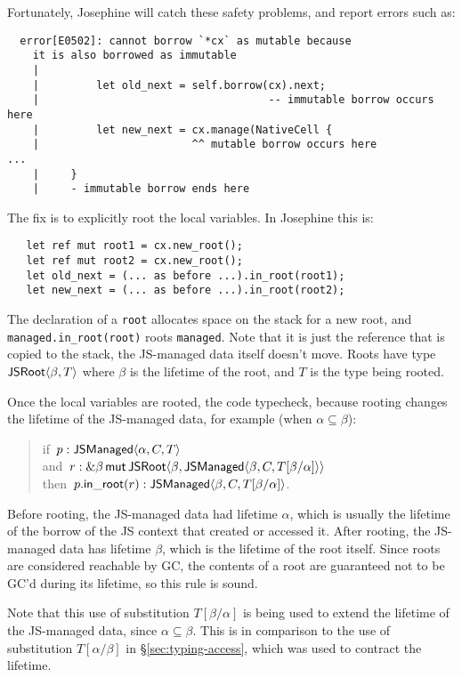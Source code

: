 Fortunately, Josephine will catch these safety problems, and report
errors such as:
\begin{verbatim}
  error[E0502]: cannot borrow `*cx` as mutable because
    it is also borrowed as immutable
    |
    |         let old_next = self.borrow(cx).next;
    |                                    -- immutable borrow occurs here
    |         let new_next = cx.manage(NativeCell {
    |                        ^^ mutable borrow occurs here
...
    |     }
    |     - immutable borrow ends here
\end{verbatim}
The fix is to explicitly root the local variables. In Josephine this is:
\begin{verbatim}
   let ref mut root1 = cx.new_root();
   let ref mut root2 = cx.new_root();
   let old_next = (... as before ...).in_root(root1);
   let new_next = (... as before ...).in_root(root2);
\end{verbatim}
The declaration of a \verb|root| allocates space on the stack
for a new root, and \verb|managed.in_root(root)| roots \verb|managed|.
Note that it is just the reference that is copied to the stack,
the JS-managed data itself doesn't move.
Roots have type $\mathsf{JSRoot}\langle \beta,T\rangle$ where $\beta$ is the lifetime
of the root, and $T$ is the type being rooted.

Once the local variables are rooted, the code typecheck,
because rooting changes the lifetime of the JS-managed
data, for example (when $\alpha \subseteq \beta$):
\begin{quote}
  if~$p: \mathsf{JSManaged}\langle \alpha,C,T\rangle$ \\
  and~$r: \&\beta\,\mathsf{mut}\,{\mathsf{JSRoot}\langle \beta,\mathsf{JSManaged}\langle \beta,C,T[\beta/\alpha]\rangle\rangle}$ \\
  then~$p.\mathsf{in\_root}(r): \mathsf{JSManaged}\langle \beta,C,T[\beta/\alpha]\rangle$.
\end{quote}
Before rooting, the JS-managed data had lifetime $\alpha$,
which is usually the lifetime of the borrow of the JS context
that created or accessed it.
After rooting, the JS-managed data has lifetime $\beta$,
which is the lifetime of the root itself. Since roots are
considered reachable by GC, the contents of a root
are guaranteed not to be GC'd during its lifetime,
so this rule is sound.

Note that this use of substitution $T[\beta/\alpha]$
is being used to extend the lifetime of the
JS-managed data, since $\alpha\subseteq\beta$. This
is in comparison to the use of substitution $T[\alpha/\beta]$
in \S\ref{sec:typing-access}, which was used to contract the
lifetime.

